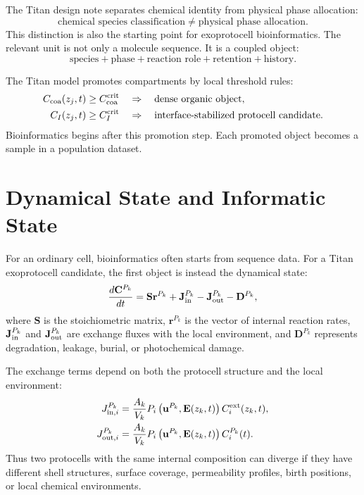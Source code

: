 \documentclass[11pt]{article}
\begin{document}
The Titan design note separates chemical identity from physical phase allocation:
\begin{equation}
\text{chemical species classification}
\neq
\text{physical phase allocation}.
\end{equation}
This distinction is also the starting point for exoprotocell bioinformatics. The relevant unit is not only a molecule sequence. It is a coupled object:
\begin{equation}
\text{species}
+
\text{phase}
+
\text{reaction role}
+
\text{retention}
+
\text{history}.
\end{equation}

The Titan model promotes compartments by local threshold rules:
\begin{align}
C_{\rm coa}(z_j,t) &\ge C_{\rm coa}^{\rm crit}
\quad \Rightarrow \quad
\text{dense organic object},\\
C_I(z_j,t) &\ge C_I^{\rm crit}
\quad \Rightarrow \quad
\text{interface-stabilized protocell candidate}.
\end{align}
Bioinformatics begins after this promotion step. Each promoted object becomes a sample in a population dataset.

\section{Dynamical State and Informatic State}

For an ordinary cell, bioinformatics often starts from sequence data. For a Titan exoprotocell candidate, the first object is instead the dynamical state:
\begin{equation}
\frac{d\mathbf{C}^{P_k}}{dt}
=
\mathbf{S}\mathbf{r}^{P_k}
+
\mathbf{J}_{\rm in}^{P_k}
-
\mathbf{J}_{\rm out}^{P_k}
-
\mathbf{D}^{P_k},
\end{equation}
where $\mathbf{S}$ is the stoichiometric matrix, $\mathbf{r}^{P_k}$ is the vector of internal reaction rates, $\mathbf{J}_{\rm in}^{P_k}$ and $\mathbf{J}_{\rm out}^{P_k}$ are exchange fluxes with the local environment, and $\mathbf{D}^{P_k}$ represents degradation, leakage, burial, or photochemical damage.

The exchange terms depend on both the protocell structure and the local environment:
\begin{align}
J_{{\rm in},i}^{P_k}
&=
\frac{A_k}{V_k}
P_i
\left(\mathbf{u}^{P_k},\mathbf{E}(z_k,t)\right)
C_i^{\rm ext}(z_k,t),\\
J_{{\rm out},i}^{P_k}
&=
\frac{A_k}{V_k}
P_i
\left(\mathbf{u}^{P_k},\mathbf{E}(z_k,t)\right)
C_i^{P_k}(t).
\end{align}
Thus two protocells with the same internal composition can diverge if they have different shell structures, surface coverage, permeability profiles, birth positions, or local chemical environments.
\end{document}
